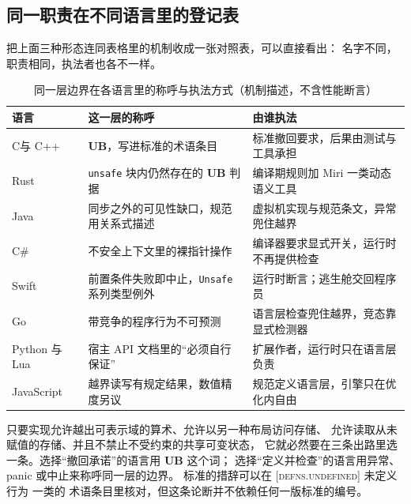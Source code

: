 \documentclass[12pt,a4paper,fontset=fandol]{ctexbook}
\newcommand{\Tp}[1]{\texttt{#1}}
\newcommand{\Lang}[1]{\textsf{#1}}
\newcommand{\CL}{\Lang{C}}
\newcommand{\CPP}{\Lang{C++}}
\newcommand{\UB}{\textbf{\textsf{UB}}}
\newcommand{\Std}[1]{\textsc{[#1]}}
\newcommand{\Clause}[1]{\textsc{\small #1}}
\newcommand{\Mx}[1]{\textsf{#1}}
\begin{document}
\subsection{同一职责在不同语言里的登记表}\label{sec:ub02-registry}

把上面三种形态连同表格里的机制收成一张对照表，可以直接看出：
名字不同，职责相同，执法者也各不一样。

\begin{table}
\centering
\caption{同一层边界在各语言里的称呼与执法方式（机制描述，不含性能断言）}
\label{tab:ub02-registry}
\begin{tabularx}{0.76\textwidth}{@{}>{\raggedright\arraybackslash}p{} >{\raggedright\arraybackslash}p{} X@{}}
\toprule
语言 & 这一层的称呼 & 由谁执法 \\
\midrule
\CL 与 \CPP & \UB{}，写进标准的术语条目 & 标准撤回要求，后果由测试与工具承担 \\
\Lang{Rust} & \Tp{unsafe} 块内仍然存在的 \UB{} 判据 & 编译期规则加 \Mx{Miri} 一类动态语义工具 \\
\Lang{Java} & 同步之外的可见性缺口，规范用关系式描述 & 虚拟机实现与规范条文，异常兜住越界 \\
\Lang{C\#} & 不安全上下文里的裸指针操作 & 编译器要求显式开关，运行时不再提供检查 \\
\Lang{Swift} & 前置条件失败即中止，\Tp{Unsafe} 系列类型例外 & 运行时断言；逃生舱交回程序员 \\
\Lang{Go} & 带竞争的程序行为不可预测 & 语言层检查兜住越界，竞态靠显式检测器 \\
\Lang{Python} 与 \Lang{Lua} & 宿主 API 文档里的“必须自行保证” & 扩展作者，运行时只在语言层负责 \\
\Lang{JavaScript} & 越界读写有规定结果，数值精度另议 & 规范定义语言层，引擎只在优化内自由 \\
\bottomrule
\end{tabularx}
\end{table}

\begin{clause}[title={为什么这一层不可省略}]
只要实现允许越出可表示域的算术、允许以另一种布局访问存储、
允许读取从未赋值的存储、并且不禁止不受约束的共享可变状态，
它就必然要在三条出路里选一条。选择“撤回承诺”的语言用 \UB{} 这个词；
选择“定义并检查”的语言用异常、panic 或中止来称呼同一层的边界。
标准的措辞可以在 \Std{defns.undefined} \Clause{未定义行为} 一类的
术语条目里核对，但这条论断并不依赖任何一版标准的编号。
\end{clause}
\end{document}
